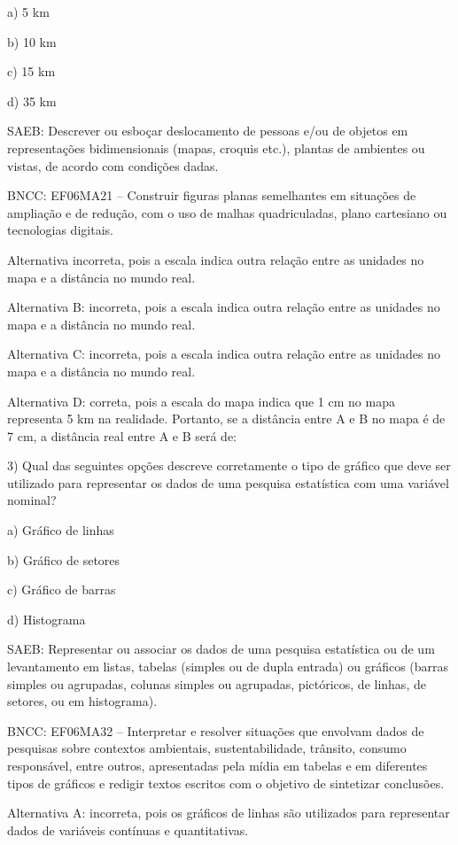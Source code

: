 a) 5 km

b) 10 km

c) 15 km

d) 35 km

SAEB: Descrever ou esboçar deslocamento de pessoas e/ou de objetos em
representações bidimensionais (mapas, croquis etc.), plantas de
ambientes ou vistas, de acordo com condições dadas.

BNCC: EF06MA21 -- Construir figuras planas semelhantes em situações de
ampliação e de redução, com o uso de malhas quadriculadas, plano
cartesiano ou tecnologias digitais.

Alternativa incorreta, pois a escala indica outra relação entre as
unidades no mapa e a distância no mundo real.

Alternativa B: incorreta, pois a escala indica outra relação entre as
unidades no mapa e a distância no mundo real.

Alternativa C: incorreta, pois a escala indica outra relação entre as
unidades no mapa e a distância no mundo real.

Alternativa D: correta, pois a escala do mapa indica que 1 cm no mapa
representa 5 km na realidade. Portanto, se a distância entre A e B no
mapa é de 7 cm, a distância real entre A e B será de:

3) Qual das seguintes opções descreve corretamente o tipo de gráfico que
deve ser utilizado para representar os dados de uma pesquisa estatística
com uma variável nominal?

a) Gráfico de linhas

b) Gráfico de setores

c) Gráfico de barras

d) Histograma

SAEB: Representar ou associar os dados de uma pesquisa estatística ou de
um levantamento em listas, tabelas (simples ou de dupla entrada) ou
gráficos (barras simples ou agrupadas, colunas simples ou agrupadas,
pictóricos, de linhas, de setores, ou em histograma).

BNCC: EF06MA32 -- Interpretar e resolver situações que envolvam dados de
pesquisas sobre contextos ambientais, sustentabilidade, trânsito,
consumo responsável, entre outros, apresentadas pela mídia em tabelas e
em diferentes tipos de gráficos e redigir textos escritos com o objetivo
de sintetizar conclusões.

Alternativa A: incorreta, pois os gráficos de linhas são utilizados para
representar dados de variáveis contínuas e quantitativas.

